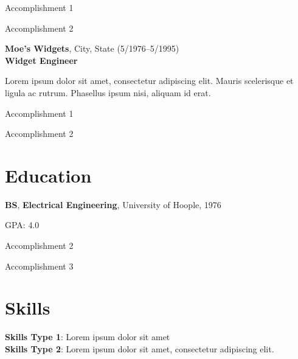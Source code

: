 \documentclass[11pt, letterpaper]{article}
\begin{document}
\vspace{-.1in}

\begin{itemize*}
\item Accomplishment 1
\item Accomplishment 2
\end{itemize*}

\vspace{-.1in}

\textbf{Moe's Widgets}, City, State \hfill (5/1976--5/1995)\\
\textbf{Widget Engineer}

Lorem ipsum dolor sit amet, consectetur adipiscing elit. Mauris scelerisque et ligula ac rutrum. Phasellus ipsum nisi, aliquam id erat. 

\vspace{-.1in}
\begin{itemize*}
\item Accomplishment 1
\item Accomplishment 2
\end{itemize*}


\section*{Education}

\textbf{BS}, \textbf{Electrical Engineering}, University of Hoople, 1976
\vspace{-.1in}
\begin{itemize*}
\item GPA: 4.0
\item Accomplishment 2
\item Accomplishment 3
\end{itemize*}

\section*{Skills}
\textbf{Skills Type 1}: Lorem ipsum dolor sit amet\\
\textbf{Skills Type 2}: Lorem ipsum dolor sit amet, consectetur adipiscing elit.
\end{document}
